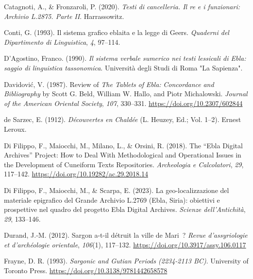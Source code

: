 \documentclass[
]{book}
\newlength{\cslhangindent}
\newlength{\cslentryspacingunit} %
\newenvironment{CSLReferences}[2] %
 {%
  \setlength{\parindent}{0pt}
  \ifodd #1
  \let\oldpar\par
  \def\par{\hangindent=\cslhangindent\oldpar}
  \fi
  \setlength{\parskip}{#2\cslentryspacingunit}
 }%
 {}
\begin{document}
\begin{CSLReferences}{1}{0}
\leavevmode{}%
Catagnoti, A., \& Fronzaroli, P. (2020). \emph{Testi di cancelleria. Il re e i funzionari: Archivio L.2875. Parte II}. Harrassowitz.

\leavevmode{}%
Conti, G. (1993). Il sistema grafico eblaita e la legge di Geers. \emph{Quaderni del Dipartimento di Linguistica}, \emph{4}, 97--114.

\leavevmode{}%
D'Agostino, Franco. (1990). \emph{Il sistema verbale sumerico nei testi lessicali di Ebla: saggio di linguistica tassonomica}. Università degli Studi di Roma "La Sapienza".

\leavevmode{}%
Davidović, V. (1987). Review of {\emph{The Tablets}}{ \emph{of} }{\emph{Ebla}}{\emph{:} }{\emph{Concordance}}{ \emph{and} }{\emph{Bibliography}} by {Scott G}. {Beld}, {William W}. {Hallo}, and {Piotr Michalowski}. \emph{Journal of the American Oriental Society}, \emph{107}, 330--331. \url{https://doi.org/10.2307/602844}

\leavevmode{}%
de Sarzec, E. (1912). \emph{Découvertes en Chaldée} (L. Heuzey, Ed.; Vol. 1--2). Ernest Leroux.

\leavevmode{}%
Di Filippo, F., Maiocchi, M., Milano, L., \& Orsini, R. (2018). The {``Ebla Digital Archives''} Project: How to Deal With Methodological and Operational Issues in the Development of Cuneiform Texts Repositories. \emph{Archeologia e Calcolatori}, \emph{29}, 117--142. \url{https://doi.org/10.19282/ac.29.2018.14}

\leavevmode{}%
Di Filippo, F., Maiocchi, M., \& Scarpa, E. (2023). La geo-localizzazione del materiale epigrafico del Grande Archivio L.2769 (Ebla, Siria): obiettivi e prospettive nel quadro del progetto Ebla Digital Archives. \emph{Scienze dell'Antichità}, \emph{29}, 133--146.

\leavevmode{}%
Durand, J.-M. (2012). Sargon a-t-il détruit la ville de Mari~? \emph{Revue d'assyriologie et d'archéologie orientale}, \emph{106}(1), 117--132. \url{https://doi.org/10.3917/assy.106.0117}

\leavevmode{}%
Frayne, D. R. (1993). \emph{Sargonic and {Gutian Periods} (2234-2113 {BC})}. University of Toronto Press. \url{https://doi.org/10.3138/9781442658578}


\end{CSLReferences}
\end{document}
